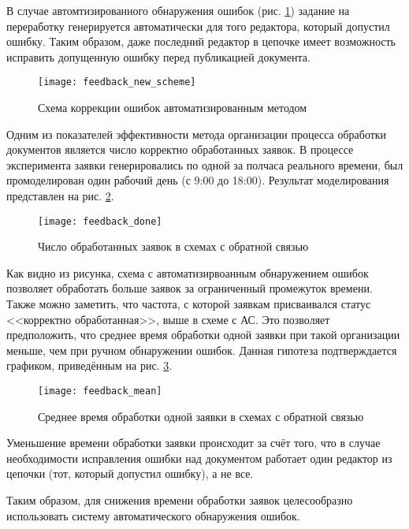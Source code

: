 \vspace{\baselineskip}
В случае автомтизированного обнаружения ошибок (рис. \ref{img:feedback_new_scheme}) задание на переработку генерируется автоматически для того редактора, который допустил ошибку. Таким образом, даже последний редактор в цепочке имеет возможность исправить допущенную ошибку перед публикацией документа.

\begin{figure}[h!]
  \centering
  \texttt{[image: feedback\_new\_scheme]}
  \caption{Схема коррекции ошибок автоматизированным методом}
  \label{img:feedback_new_scheme}
\end{figure}

\vspace{\baselineskip}
Одним из показателей эффективности метода организации процесса обработки документов является число корректно обработанных заявок. В процессе эксперимента заявки генерировались по одной за полчаса реального времени, был промоделирован один рабочий день (с 9:00 до 18:00). Результат моделирования представлен на рис. \ref{img:feedback_done}.

\begin{figure}[h!]
  \centering
  \texttt{[image: feedback\_done]}
  \caption{Число обработанных заявок в схемах с обратной связью}
  \label{img:feedback_done}
\end{figure}

\vspace{\baselineskip}
Как видно из рисунка, схема с автоматизирвоанным обнаружением ошибок позволяет обработать больше заявок за ограниченный промежуток времени. Также можно заметить, что частота, с которой заявкам присваивался статус <<корректно обработанная>>, выше в схеме с АС. Это позволяет предположить, что среднее время обработки одной заявки при такой организации меньше, чем при ручном обнаружении ошибок. Данная гипотеза подтверждается графиком, приведённым на рис. \ref{img:feedback_mean}.

\begin{figure}[h!]
  \centering
  \texttt{[image: feedback\_mean]}
  \caption{Среднее время обработки одной заявки в схемах с обратной связью}
  \label{img:feedback_mean}
\end{figure}

\vspace{\baselineskip}
Уменьшение времени обработки заявки происходит за счёт того, что в случае необходимости исправления ошибки над документом работает один редактор из цепочки (тот, который допустил ошибку), а не все.

\vspace{\baselineskip}
Таким образом, для снижения времени обработки заявок целесообразно использовать систему автоматического обнаружения ошибок.